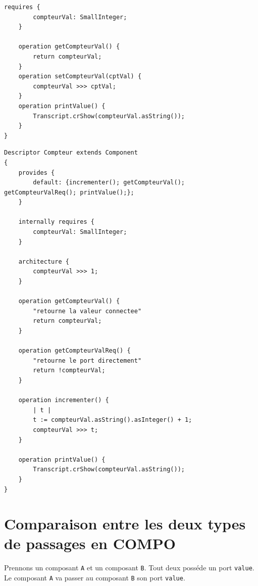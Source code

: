 \documentclass[11pt,a4paper,openany,oneside]{book}
\begin{document}
\begin{appendices}
\begin{lstlisting}[language=Compo, frame=single, caption=Programme Suiveur]
	requires {
		compteurVal: SmallInteger;
	}
	
	operation getCompteurVal() {
		return compteurVal;
	}
	operation setCompteurVal(cptVal) {
		compteurVal >>> cptVal;
	}
	operation printValue() {
	    Transcript.crShow(compteurVal.asString());
	}
}
\end{lstlisting}

\begin{lstlisting}[language=Compo, frame=single, caption=Programme Compteur]
Descriptor Compteur extends Component
{
	provides {
		default: {incrementer(); getCompteurVal(); getCompteurValReq(); printValue();};
	}
	
	internally requires {
		compteurVal: SmallInteger;
	}
	
	architecture {
	    compteurVal >>> 1;
	}
	
	operation getCompteurVal() {
	    "retourne la valeur connectee"
		return compteurVal;
	}
	
	operation getCompteurValReq() {
	    "retourne le port directement"
		return !compteurVal;
	}
	
	operation incrementer() {
	    | t |
	    t := compteurVal.asString().asInteger() + 1;
	    compteurVal >>> t;
	}
	
	operation printValue() {
	    Transcript.crShow(compteurVal.asString());
	}
}
\end{lstlisting}


\chapter{Comparaison entre les deux types de passages en COMPO}
\label{passagereqprovider}

Prennons un composant \texttt{A} et un composant \texttt{B}. Tout deux posséde un port \texttt{value}. Le composant \texttt{A} va passer au composant \texttt{B} son port \texttt{value}.


\end{appendices}
\end{document}

